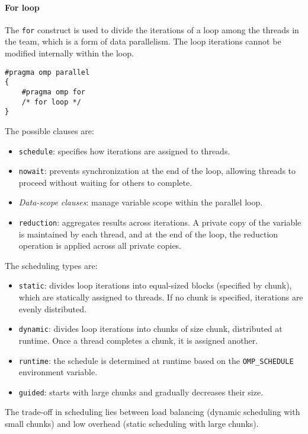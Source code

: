 \paragraph*{For loop}
The \texttt{for} construct is used to divide the iterations of a loop among the threads in the team, which is a form of data parallelism. 
The loop iterations cannot be modified internally within the loop.
\begin{lstlisting}[style=C]
#pragma omp parallel 
{
    #pragma omp for
    /* for loop */
}
\end{lstlisting}
The possible clauses are: 
\begin{itemize}
    \item \texttt{schedule}: specifies how iterations are assigned to threads.
    \item \texttt{nowait}: prevents synchronization at the end of the loop, allowing threads to proceed without waiting for others to complete.
    \item \textit{Data-scope clauses}: manage variable scope within the parallel loop.
    \item \texttt{reduction}: aggregates results across iterations. 
        A private copy of the variable is maintained by each thread, and at the end of the loop, the reduction operation is applied across all private copies.
\end{itemize}
\noindent The scheduling types are: 
\begin{itemize}
    \item \texttt{static}: divides loop iterations into equal-sized blocks (specified by chunk), which are statically assigned to threads. 
        If no chunk is specified, iterations are evenly distributed.
    \item \texttt{dynamic}: divides loop iterations into chunks of size chunk, distributed at runtime. 
        Once a thread completes a chunk, it is assigned another.
    \item \texttt{runtime}: the schedule is determined at runtime based on the \texttt{OMP\_SCHEDULE} environment variable.
    \item \texttt{guided}: starts with large chunks and gradually decreases their size.
\end{itemize}
The trade-off in scheduling lies between load balancing (dynamic scheduling with small chunks) and low overhead (static scheduling with large chunks).

